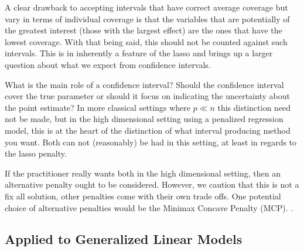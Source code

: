 A clear drawback to accepting intervals that have correct average coverage but vary in terms of individual coverage is that the variables that are potentially of the greatest interest (those with the largest effect) are the ones that have the lowest coverage. With that being said, this should not be counted against such intervals. This is in inherently a feature of the lasso and brings up a larger question about what we expect from confidence intervals. 

What is the main role of a confidence interval? Should the confidence interval cover the true parameter or should it focus on indicating the uncertainty about the point estimate? In more classical settings where $p \ll n$ this distinction need not be made, but in the high dimensional setting using a penalized regression model, this is at the heart of the distinction of what interval producing method you want. Both can not (reasonably) be had in this setting, at least in regards to the lasso penalty.

If the practitioner really wants both in the high dimensional setting, then an alternative penalty ought to be considered. However, we caution that this is not a fix all solution, other penalties come with their own trade offs. One potential choice of alternative penalties would be the Minimax Concave Penalty (MCP). .

\subsection{Applied to Generalized Linear Models}


